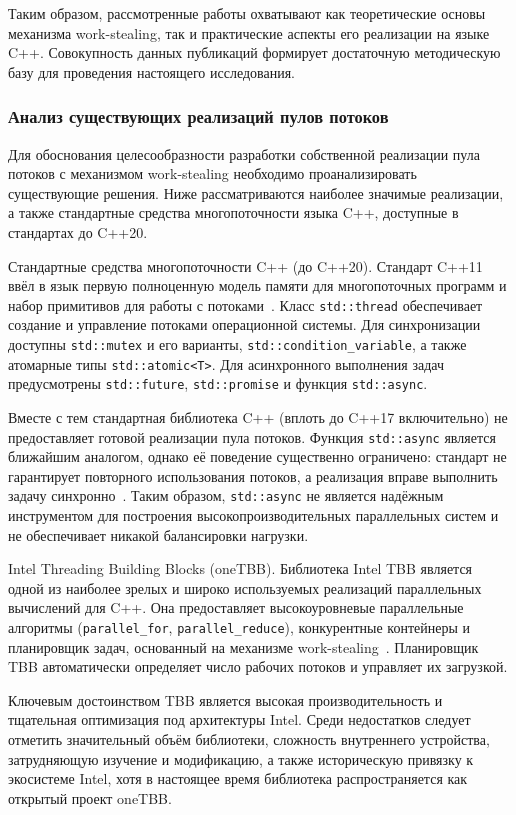 Таким образом, рассмотренные работы охватывают как теоретические
основы механизма work-stealing, так и практические аспекты его
реализации на языке C++. Совокупность данных публикаций формирует
достаточную методическую базу для проведения настоящего исследования.

\subsubsection{Анализ существующих реализаций пулов потоков}

Для обоснования целесообразности разработки собственной реализации
пула потоков с механизмом work-stealing необходимо проанализировать
существующие решения. Ниже рассматриваются наиболее значимые
реализации, а также стандартные средства многопоточности языка C++,
доступные в стандартах до C++20.

Стандартные средства многопоточности C++ (до C++20).
Стандарт C++11 ввёл в язык первую полноценную модель памяти
для многопоточных программ и набор примитивов для работы
с потоками~\cite{Williams2019}. Класс \texttt{std::thread}
обеспечивает создание и управление потоками операционной системы.
Для синхронизации доступны \texttt{std::mutex} и его варианты,
\texttt{std::condition\_variable}, а также атомарные типы
\texttt{std::atomic<T>}. Для асинхронного выполнения задач
предусмотрены \texttt{std::future}, \texttt{std::promise}
и функция \texttt{std::async}.

Вместе с тем стандартная библиотека C++ (вплоть до C++17
включительно) не предоставляет готовой реализации пула потоков.
Функция \texttt{std::async} является ближайшим аналогом, однако
её поведение существенно ограничено: стандарт не гарантирует
повторного использования потоков, а реализация вправе выполнить
задачу синхронно~\cite{Williams2019}. Таким образом,
\texttt{std::async} не является надёжным инструментом для построения
высокопроизводительных параллельных систем и не обеспечивает
никакой балансировки нагрузки.

Intel Threading Building Blocks (oneTBB).
Библиотека Intel TBB является одной из наиболее зрелых и широко
используемых реализаций параллельных вычислений для C++.
Она предоставляет высокоуровневые параллельные алгоритмы
(\texttt{parallel\_for}, \texttt{parallel\_reduce}), конкурентные
контейнеры и планировщик задач, основанный на механизме
work-stealing~\cite{Reinders2007}. Планировщик TBB автоматически
определяет число рабочих потоков и управляет их загрузкой.

Ключевым достоинством TBB является высокая производительность
и тщательная оптимизация под архитектуры Intel. Среди недостатков
следует отметить значительный объём библиотеки, сложность внутреннего
устройства, затрудняющую изучение и модификацию, а также
историческую привязку к экосистеме Intel, хотя в настоящее время
библиотека распространяется как открытый проект oneTBB.

